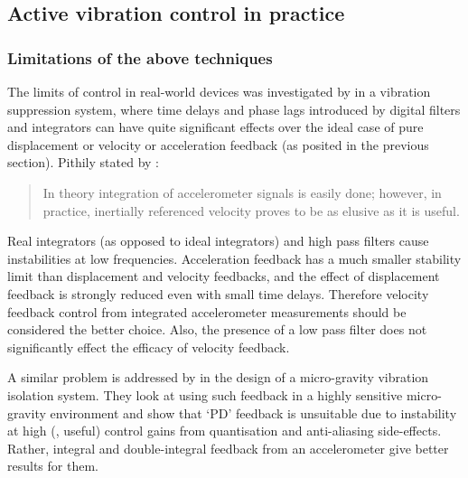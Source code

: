 \subsection{Active vibration control in practice}

\subsubsection{Limitations of the above techniques}

The limits of control in real-world devices was investigated by \textcite{ananthaganeshan2001} in a vibration suppression system, where time delays and phase lags introduced by digital filters
and integrators can have quite significant effects over the ideal case of pure displacement or velocity or acceleration feedback (as posited in the previous section). Pithily stated by \textcite{williams2009}:
\begin{quote}
In theory integration of accelerometer signals is easily done; however, in practice, inertially referenced velocity proves to be as elusive as it is useful.
\end{quote}
Real integrators (as opposed to ideal integrators) and high pass filters cause instabilities at low frequencies.
Acceleration feedback has a much smaller stability limit than displacement and velocity feedbacks, and the effect of displacement feedback is strongly reduced even with small time delays.
Therefore velocity feedback control from integrated accelerometer measurements should be considered the better choice.
Also, the presence of a low pass filter does not significantly effect the efficacy of velocity feedback.

A similar problem is addressed by \textcite{zhu2006} in the design of a micro-gravity vibration isolation system. They look at using such feedback in a highly sensitive micro-gravity environment and show that `PD' feedback is unsuitable due to instability at high (\ie, useful) control gains from quantisation and anti-aliasing side-effects.
Rather, integral and double-integral feedback from an accelerometer give better results for them.

